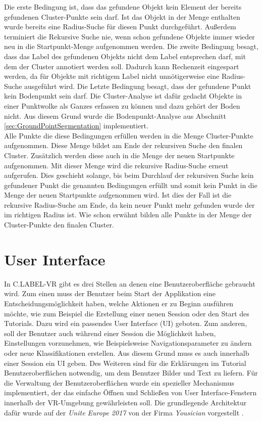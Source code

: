 Die erste Bedingung ist, dass das gefundene Objekt kein Element der bereits gefundenen Cluster-Punkte sein darf. Ist das Objekt in der Menge enthalten wurde bereits eine Radius-Suche für diesen Punkt durchgeführt. Außerdem terminiert die Rekursive Suche nie, wenn schon gefundene Objekte immer wieder neu in die Startpunkt-Menge aufgenommen werden. Die zweite Bedingung besagt, dass das Label des gefundenen Objekts nicht dem Label entsprechen darf, mit dem der Cluster annotiert werden soll. Dadurch kann Rechenzeit eingespart werden, da für Objekte mit richtigem Label nicht unnötigerweise eine Radius-Suche ausgeführt wird. Die Letzte Bedingung besagt, dass der gefundene Punkt kein Bodenpunkt sein darf. Die Cluster-Analyse ist dafür gedacht Objekte in einer Punktwolke als Ganzes erfassen zu können und dazu gehört der Boden nicht. Aus diesem Grund wurde die Bodenpunkt-Analyse aus Abschnitt \ref{sec:GroundPointSegmentation} implementiert.\\

Alle Punkte die diese Bedingungen erfüllen werden in die Menge Cluster-Punkte aufgenommen. Diese Menge bildet am Ende der rekursiven Suche den finalen Cluster. Zusätzlich werden diese auch in die Menge der neuen Startpunkte aufgenommen. Mit dieser Menge wird die rekursive Radius-Suche erneut aufgerufen. Dies geschieht solange, bis beim Durchlauf der rekursiven Suche kein gefundener Punkt die genannten Bedingungen erfüllt und somit kein Punkt in die Menge der neuen Startpunkte aufgenommen wird. Ist dies der Fall ist die rekursive Radius-Suche am Ende, da kein neuer Punkt mehr gefunden wurde der im richtigen Radius ist. Wie schon erwähnt bilden alle Punkte in der Menge der Cluster-Punkte den finalen Cluster.  

\section{User Interface}
\label{sec:UIMenu}
In C.LABEL-VR gibt es drei Stellen an denen eine Benutzeroberfläche gebraucht wird. Zum einen muss der Benutzer beim Start der Applikation eine Entscheidungsmöglichkeit haben, welche Aktionen er zu Beginn ausführen möchte, wie zum Beispiel die Erstellung einer neuen Session oder den Start des Tutorials. Dazu wird ein passendes User Interface (UI) geboten. Zum anderen, soll der Benutzer auch während einer Session die Möglichkeit haben, Einstellungen vorzunehmen, wie Beispielsweise Navigationsparameter zu ändern oder neue Klassifikationen erstellen. Aus diesem Grund muss es auch innerhalb einer Session ein UI geben. Des Weiteren sind für die Erklärungen im Tutorial Benutzeroberflächen notwendig, um dem Benutzer Bilder und Text zu liefern. Für die Verwaltung der Benutzeroberflächen wurde ein spezieller Mechanismus implementiert, der das einfache Öffnen und Schließen von User Interface-Fenstern innerhalb der VR-Umgebung gewährleisten soll. Die grundlegende Architektur dafür wurde auf der \textit{Unite Europe 2017} von der Firma \textit{Yousician} vorgestellt \cite{bib:UnityMenuSystem}.\\

